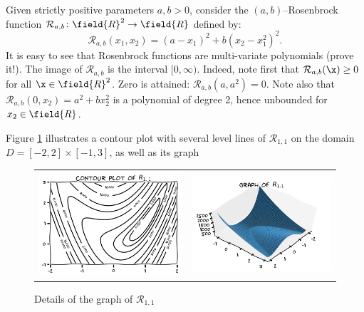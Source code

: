 \begin{example}\label{example:Rosenbrock2}
Given strictly positive parameters $a,b > 0$, consider the $(a,b)$--Rosenbrock function $\mathcal{R}_{a,b}\colon \field{R}^2 \to \field{R}$ defined by:
\begin{equation*} 
\mathcal{R}_{a,b}(x_1, x_2) = (a-x_1)^2 + b(x_2-x_1^2)^2.
\end{equation*}
It is easy to see that Rosenbrock functions are multi-variate polynomials (prove it!).  The image of $\mathcal{R}_{a,b}$ is the interval $[0,\infty)$.  Indeed, note first that $\mathcal{R}_{a,b}(\x) \geq 0$ for all $\x \in \field{R}^2$.  Zero is attained: $\mathcal{R}_{a,b} (a,a^2) = 0$.  Note also that $\mathcal{R}_{a,b}(0,x_2) = a^2 + bx_2^2$ is a polynomial of degree 2, hence unbounded for $x_2 \in \field{R}$.

Figure \ref{figure:Rosenbrock} illustrates a contour plot with several level lines of $\mathcal{R}_{1,1}$ on the domain $D = [-2,2] \times [-1,3]$, as well as its graph
\begin{figure}[ht!]
\begin{tabular}{cc}
\includegraphics[width=0.5\linewidth]{rosenbrockContour} &
\includegraphics[width=0.5\linewidth]{rosenbrockGraph}
\end{tabular}
\caption{Details of the graph of $\mathcal{R}_{1,1}$}
\label{figure:Rosenbrock}
\end{figure}
\end{example}

